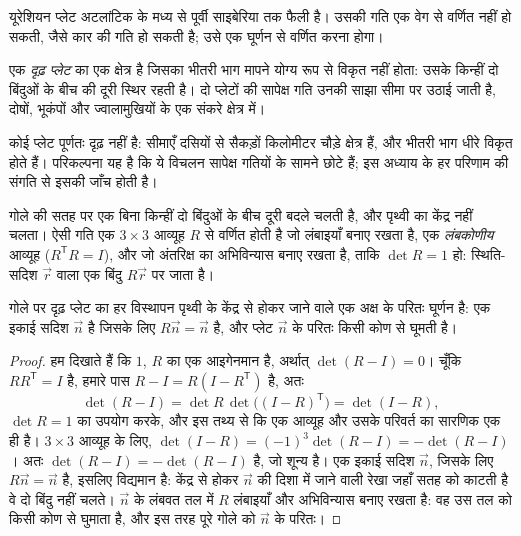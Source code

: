 यूरेशियन प्लेट अटलांटिक के मध्य से पूर्वी साइबेरिया तक फैली है। उसकी गति एक वेग से वर्णित नहीं हो सकती, जैसे कार की गति हो सकती है; उसे एक घूर्णन से वर्णित करना होगा।

\begin{definition}[दृढ़ प्लेट]\label{def:b1:plate-kinematics:rigid-plate}
एक \emph{दृढ़ प्लेट}  का एक क्षेत्र है जिसका भीतरी भाग मापने योग्य रूप से विकृत नहीं होता: उसके किन्हीं दो बिंदुओं के बीच की दूरी स्थिर रहती है। दो प्लेटों की सापेक्ष गति उनकी साझा सीमा पर उठाई जाती है, दोषों, भूकंपों और ज्वालामुखियों के एक संकरे क्षेत्र में।
\end{definition}

कोई प्लेट पूर्णतः दृढ़ नहीं है: सीमाएँ दसियों से सैकड़ों किलोमीटर चौड़े क्षेत्र हैं, और भीतरी भाग धीरे विकृत होते हैं। परिकल्पना यह है कि ये विचलन सापेक्ष गतियों के सामने छोटे हैं; इस अध्याय के हर परिणाम की संगति से इसकी जाँच होती है।

गोले की सतह पर एक  बिना किन्हीं दो बिंदुओं के बीच दूरी बदले चलती है, और पृथ्वी का केंद्र नहीं चलता। ऐसी गति एक $3\times3$ आव्यूह $R$ से वर्णित होती है जो लंबाइयाँ बनाए रखता है, एक \emph{लंबकोणीय} आव्यूह ($R^{\mathsf T}R = I$), और जो अंतरिक्ष का अभिविन्यास बनाए रखता है, ताकि $\det R = 1$ हो: स्थिति-सदिश $\vec r$ वाला एक बिंदु $R\vec r$ पर जाता है।

\begin{theorem}[यूलर का घूर्णन प्रमेय]\label{thm:b1:plate-kinematics:euler}
गोले पर दृढ़ प्लेट का हर विस्थापन पृथ्वी के केंद्र से होकर जाने वाले एक अक्ष के परितः घूर्णन है: एक इकाई सदिश $\vec n$ है जिसके लिए $R\vec n = \vec n$ है, और प्लेट $\vec n$ के परितः किसी कोण से घूमती है।
\end{theorem}

\begin{proof}
हम दिखाते हैं कि $1$, $R$ का एक आइगेनमान है, अर्थात् $\det(R - I) = 0$। चूँकि
$R R^{\mathsf T} = I$ है, हमारे पास $R - I = R(I - R^{\mathsf T})$ है, अतः
\[
  \det(R - I) = \det R\,\det\bigl((I - R)^{\mathsf T}\bigr) = \det(I - R),
\]
$\det R = 1$ का उपयोग करके, और इस तथ्य से कि एक आव्यूह और उसके परिवर्त का सारणिक एक ही है। $3\times3$ आव्यूह के लिए,
$\det(I - R) = (-1)^3\det(R - I) = -\det(R - I)$। अतः $\det(R - I) =
-\det(R - I)$ है, जो शून्य है। एक इकाई सदिश $\vec n$, जिसके लिए $R\vec n = \vec n$ है, इसलिए विद्यमान है: केंद्र से होकर $\vec n$ की दिशा में जाने वाली रेखा जहाँ सतह को काटती है वे दो बिंदु नहीं चलते। $\vec n$ के लंबवत तल में $R$ लंबाइयाँ और अभिविन्यास बनाए रखता है: वह उस तल को किसी कोण से घुमाता है, और इस तरह पूरे गोले को $\vec n$ के परितः।
\end{proof}

